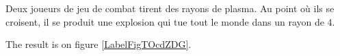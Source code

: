 
\begin{exercice}\label{exosmath-0339}

    Deux joueurs de jeu de combat tirent des rayons de plasma. Au point où ils se croisent, il se produit une explosion qui tue tout le monde dans un rayon de \unit{4}{\meter}.

The result is on figure \ref{LabelFigTOcdZDG}. %
\newcommand{\CaptionFigTOcdZDG}{<+Type your caption here+>}



\end{exercice}
